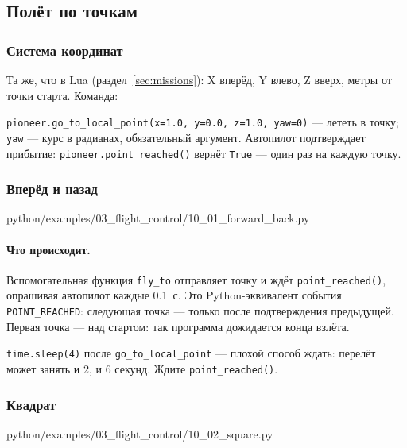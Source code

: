 \subsection{Полёт по точкам}

\subsubsection*{Система координат}

Та же, что в Lua (раздел~\ref{sec:missions}): X вперёд, Y влево, Z вверх, метры от точки старта. Команда:

\begin{codebox}
\verb|pioneer.go_to_local_point(x=1.0, y=0.0, z=1.0, yaw=0)| --- лететь в точку; \verb|yaw| --- курс в радианах, обязательный аргумент. Автопилот подтверждает прибытие: \verb|pioneer.point_reached()| вернёт \verb|True| --- один раз на каждую точку.
\end{codebox}

\subsubsection*{Вперёд и назад}

\begin{codefile}[python]{python/examples/03_flight_control/10_01_forward_back.py}
\end{codefile}

\paragraph{Что происходит.} Вспомогательная функция \verb|fly_to| отправляет точку и ждёт \verb|point_reached()|, опрашивая автопилот каждые 0.1~с. Это Python-эквивалент события \verb|POINT_REACHED|: следующая точка --- только после подтверждения предыдущей. Первая точка --- над стартом: так программа дожидается конца взлёта.

\begin{rulebox}
\verb|time.sleep(4)| после \verb|go_to_local_point| --- плохой способ ждать: перелёт может занять и 2, и 6 секунд. Ждите \verb|point_reached()|.
\end{rulebox}

\subsubsection*{Квадрат}

\begin{codefile}[python]{python/examples/03_flight_control/10_02_square.py}
\end{codefile}

